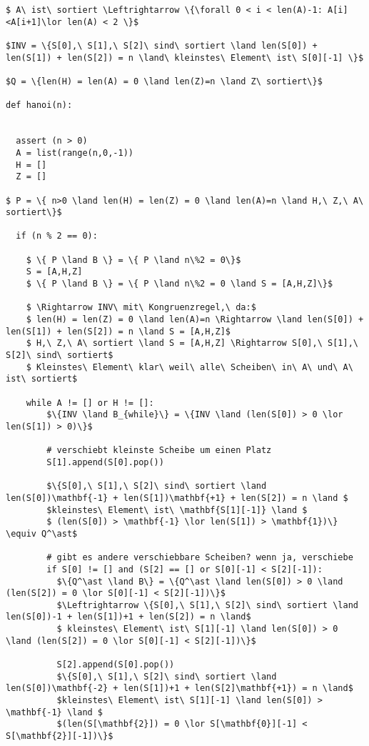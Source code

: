 \begin{lstlisting}[mathescape=true]
$ A\ ist\ sortiert \Leftrightarrow \{\forall 0 < i < len(A)-1: A[i]<A[i+1]\lor len(A) < 2 \}$

$INV = \{S[0],\ S[1],\ S[2]\ sind\ sortiert \land len(S[0]) + len(S[1]) + len(S[2]) = n \land\ kleinstes\ Element\ ist\ S[0][-1] \}$

$Q = \{len(H) = len(A) = 0 \land len(Z)=n \land Z\ sortiert\}$

def hanoi(n):


  assert (n > 0)                                      
  A = list(range(n,0,-1))
  H = []
  Z = []

$ P = \{ n>0 \land len(H) = len(Z) = 0 \land len(A)=n \land H,\ Z,\ A\ sortiert\}$

  if (n % 2 == 0):
    
    $ \{ P \land B \} = \{ P \land n\%2 = 0\}$
    S = [A,H,Z]
    $ \{ P \land B \} = \{ P \land n\%2 = 0 \land S = [A,H,Z]\}$
	
	$ \Rightarrow INV\ mit\ Kongruenzregel,\ da:$
	$ len(H) = len(Z) = 0 \land len(A)=n \Rightarrow \land len(S[0]) + len(S[1]) + len(S[2]) = n \land S = [A,H,Z]$
	$ H,\ Z,\ A\ sortiert \land S = [A,H,Z] \Rightarrow S[0],\ S[1],\ S[2]\ sind\ sortiert$
	$ Kleinstes\ Element\ klar\ weil\ alle\ Scheiben\ in\ A\ und\ A\ ist\ sortiert$

	while A != [] or H != []:
		$\{INV \land B_{while}\} = \{INV \land (len(S[0]) > 0 \lor len(S[1]) > 0)\}$

		# verschiebt kleinste Scheibe um einen Platz
		S[1].append(S[0].pop())
		
		$\{S[0],\ S[1],\ S[2]\ sind\ sortiert \land len(S[0])\mathbf{-1} + len(S[1])\mathbf{+1} + len(S[2]) = n \land $
		$kleinstes\ Element\ ist\ \mathbf{S[1][-1]} \land $
		$ (len(S[0]) > \mathbf{-1} \lor len(S[1]) > \mathbf{1})\} \equiv Q^\ast$

		# gibt es andere verschiebbare Scheiben? wenn ja, verschiebe
		if S[0] != [] and (S[2] == [] or S[0][-1] < S[2][-1]):
		  $\{Q^\ast \land B\} = \{Q^\ast \land len(S[0]) > 0 \land (len(S[2]) = 0 \lor S[0][-1] < S[2][-1])\}$
		  $\Leftrightarrow \{S[0],\ S[1],\ S[2]\ sind\ sortiert \land len(S[0])-1 + len(S[1])+1 + len(S[2]) = n \land$
		  $ kleinstes\ Element\ ist\ S[1][-1] \land len(S[0]) > 0 \land (len(S[2]) = 0 \lor S[0][-1] < S[2][-1])\}$

		  S[2].append(S[0].pop())
		  $\{S[0],\ S[1],\ S[2]\ sind\ sortiert \land len(S[0])\mathbf{-2} + len(S[1])+1 + len(S[2]\mathbf{+1}) = n \land$
		  $kleinstes\ Element\ ist\ S[1][-1] \land len(S[0]) > \mathbf{-1} \land $
		  $(len(S[\mathbf{2}]) = 0 \lor S[\mathbf{0}][-1] < S[\mathbf{2}][-1])\}$


\end{lstlisting}
